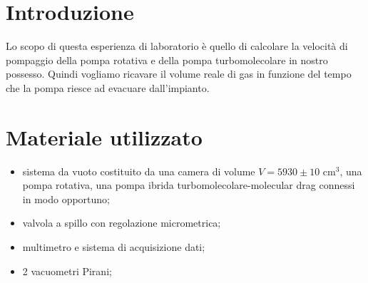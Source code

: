 \section{Introduzione}

Lo scopo di questa esperienza di laboratorio è quello di calcolare la velocità di pompaggio della pompa rotativa e della pompa turbomolecolare in nostro possesso. Quindi vogliamo ricavare il volume reale di gas in funzione del tempo che la pompa riesce ad evacuare dall'impianto.

\section{Materiale utilizzato}

\begin{itemize}
	\item{sistema da vuoto costituito da una camera di volume $V = 5930 \pm 10$ \si{\centi\metre}$^3$, una pompa rotativa, una pompa ibrida turbomolecolare-molecular drag connessi in modo opportuno;}
	\item{valvola a spillo con regolazione micrometrica;}
	\item{multimetro e sistema di acquisizione dati;}
	\item{2 vacuometri Pirani;}
\end{itemize}
